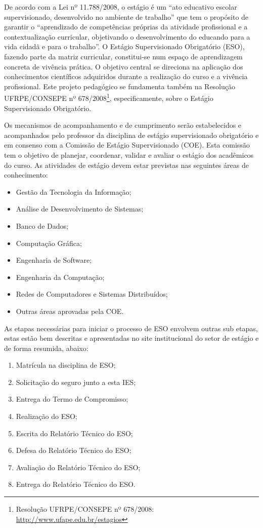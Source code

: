 \documentclass[
	12pt,				%
	openright,			%
  oneside,     %
	a4paper,			%
	english,			%
	french,				%
	spanish,			%
	brazil				%
	]{abntex2}
\begin{document}
De acordo com a Lei nº 11.788/2008, o estágio é um ``ato educativo escolar supervisionado, desenvolvido no ambiente de trabalho'' que tem o propósito de garantir o ``aprendizado de competências próprias da atividade profissional e a contextualização curricular, objetivando o desenvolvimento do educando para a vida cidadã e para o trabalho''. O Estágio Supervisionado Obrigatório (ESO), fazendo parte da matriz curricular, constitui-se num espaço de aprendizagem concreta de vivência prática. O objetivo central se direciona na aplicação dos conhecimentos científicos adquiridos durante a realização do curso e a vivência profissional. Este projeto pedagógico se fundamenta também na Resolução UFRPE/CONSEPE nº 678/2008\footnote{Resolução UFRPE/CONSEPE nº 678/2008: \url{http://www.ufape.edu.br/estagios}}, especificamente, sobre o Estágio Supervisionado Obrigatório.

Os mecanismos de acompanhamento e de cumprimento serão estabelecidos e acompanhados pelo professor da disciplina de estágio supervisionado obrigatório e em consenso com a Comissão de Estágio Supervisionado (COE). Esta comissão tem o objetivo de planejar, coordenar, validar e avaliar o estágio dos acadêmicos do curso. As atividades de estágio devem estar previstas nas seguintes áreas de conhecimento:

\begin{itemize}
    \item Gestão da Tecnologia da Informação;
    \item Análise de Desenvolvimento de Sistemas;
    \item Banco de Dados;
    \item  Computação Gráfica;
    \item  Engenharia de Software;
    \item  Engenharia da Computação;
    \item  Redes de Computadores e Sistemas Distribuídos;
    \item  Outras áreas aprovadas pela COE.
\end{itemize}

As etapas necessárias para iniciar o processo de ESO envolvem outras sub etapas, estas estão bem descritas e apresentadas no site institucional do setor de estágio e de forma resumida, abaixo:

\begin{enumerate}
    \item Matrícula na disciplina de ESO;
    \item Solicitação do seguro junto a esta IES;
    \item Entrega do Termo de Compromisso;
    \item Realização do ESO;
    \item Escrita do Relatório Técnico do ESO;
    \item Defesa do Relatório Técnico do ESO;
    \item Avaliação do Relatório Técnico do ESO;
    \item Entrega do Relatório Técnico do ESO.
\end{enumerate}
\end{document}
